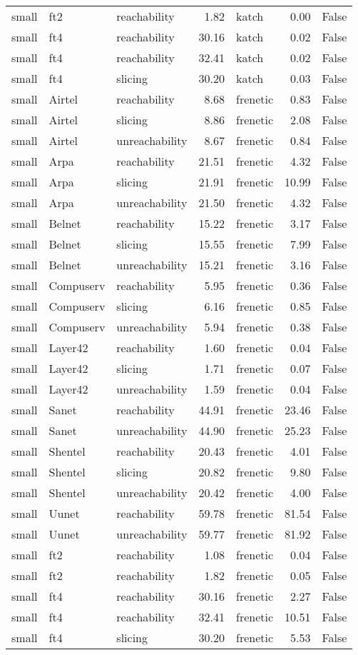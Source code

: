 \begin{tabular}{lllrlrr}
small & ft2 & reachability & 1.82 & katch & 0.00 & False \\
small & ft4 & reachability & 30.16 & katch & 0.02 & False \\
small & ft4 & reachability & 32.41 & katch & 0.02 & False \\
small & ft4 & slicing & 30.20 & katch & 0.03 & False \\
small & Airtel & reachability & 8.68 & frenetic & 0.83 & False \\
small & Airtel & slicing & 8.86 & frenetic & 2.08 & False \\
small & Airtel & unreachability & 8.67 & frenetic & 0.84 & False \\
small & Arpa & reachability & 21.51 & frenetic & 4.32 & False \\
small & Arpa & slicing & 21.91 & frenetic & 10.99 & False \\
small & Arpa & unreachability & 21.50 & frenetic & 4.32 & False \\
small & Belnet & reachability & 15.22 & frenetic & 3.17 & False \\
small & Belnet & slicing & 15.55 & frenetic & 7.99 & False \\
small & Belnet & unreachability & 15.21 & frenetic & 3.16 & False \\
small & Compuserv & reachability & 5.95 & frenetic & 0.36 & False \\
small & Compuserv & slicing & 6.16 & frenetic & 0.85 & False \\
small & Compuserv & unreachability & 5.94 & frenetic & 0.38 & False \\
small & Layer42 & reachability & 1.60 & frenetic & 0.04 & False \\
small & Layer42 & slicing & 1.71 & frenetic & 0.07 & False \\
small & Layer42 & unreachability & 1.59 & frenetic & 0.04 & False \\
small & Sanet & reachability & 44.91 & frenetic & 23.46 & False \\
small & Sanet & unreachability & 44.90 & frenetic & 25.23 & False \\
small & Shentel & reachability & 20.43 & frenetic & 4.01 & False \\
small & Shentel & slicing & 20.82 & frenetic & 9.80 & False \\
small & Shentel & unreachability & 20.42 & frenetic & 4.00 & False \\
small & Uunet & reachability & 59.78 & frenetic & 81.54 & False \\
small & Uunet & unreachability & 59.77 & frenetic & 81.92 & False \\
small & ft2 & reachability & 1.08 & frenetic & 0.04 & False \\
small & ft2 & reachability & 1.82 & frenetic & 0.05 & False \\
small & ft4 & reachability & 30.16 & frenetic & 2.27 & False \\
small & ft4 & reachability & 32.41 & frenetic & 10.51 & False \\
small & ft4 & slicing & 30.20 & frenetic & 5.53 & False \\
\bottomrule
\end{tabular}
